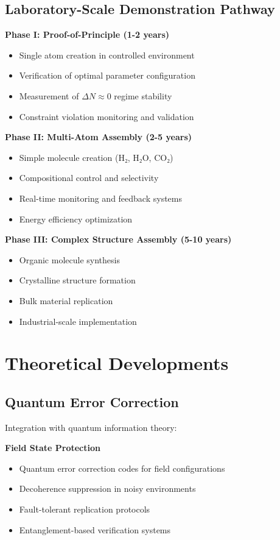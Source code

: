 \documentclass[11pt]{article}
\begin{document}
\subsection{Laboratory-Scale Demonstration Pathway}

\textbf{Phase I: Proof-of-Principle (1-2 years)}
\begin{itemize}
\item Single atom creation in controlled environment
\item Verification of optimal parameter configuration
\item Measurement of $\Delta N \approx 0$ regime stability
\item Constraint violation monitoring and validation
\end{itemize}

\textbf{Phase II: Multi-Atom Assembly (2-5 years)}
\begin{itemize}
\item Simple molecule creation (H₂, H₂O, CO₂)
\item Compositional control and selectivity
\item Real-time monitoring and feedback systems
\item Energy efficiency optimization
\end{itemize}

\textbf{Phase III: Complex Structure Assembly (5-10 years)}
\begin{itemize}
\item Organic molecule synthesis
\item Crystalline structure formation
\item Bulk material replication
\item Industrial-scale implementation
\end{itemize}

\section{Theoretical Developments}

\subsection{Quantum Error Correction}

Integration with quantum information theory:

\textbf{Field State Protection}
\begin{itemize}
\item Quantum error correction codes for field configurations
\item Decoherence suppression in noisy environments
\item Fault-tolerant replication protocols
\item Entanglement-based verification systems
\end{itemize}
\end{document}
